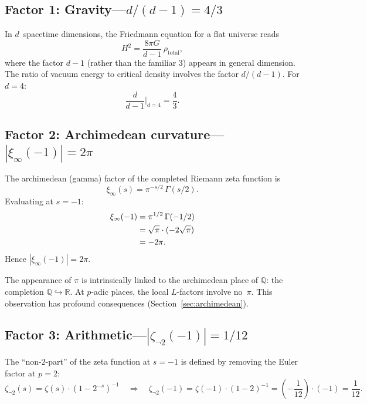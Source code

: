 \documentclass[12pt,a4paper]{article}
\theoremstyle{definition}
\newcommand{\Q}{\mathbb{Q}}
\newcommand{\R}{\mathbb{R}}
\begin{document}
\subsection{Factor 1: Gravity---$d/(d-1) = 4/3$}

In $d$~spacetime dimensions, the Friedmann equation for a flat
universe reads
\[
  H^2 = \frac{8\pi G}{d-1}\,\rho_{\text{total}},
\]
where the factor $d-1$ (rather than the familiar $3$) appears
in general dimension.
The ratio of vacuum energy to critical density involves
the factor $d/(d-1)$.
For $d=4$:
\begin{equation}
  \frac{d}{d-1}\bigg|_{d=4} = \frac{4}{3}.
\end{equation}

\subsection{Factor 2: Archimedean curvature---$|\xi_\infty(-1)| = 2\pi$}

The archimedean (gamma) factor of the completed Riemann zeta function is
\begin{equation}
  \xi_\infty(s) = \pi^{-s/2}\,\Gamma(s/2).
\end{equation}
Evaluating at $s=-1$:
\begin{align}
  \xi_\infty(-1)
    &= \pi^{1/2}\,\Gamma(-1/2) \notag\\
    &= \sqrt{\pi}\cdot(-2\sqrt{\pi}) \notag\\
    &= -2\pi.
\end{align}
Hence $|\xi_\infty(-1)| = 2\pi$.

The appearance of $\pi$ is intrinsically linked to the archimedean
place of $\Q$: the completion $\Q\hookrightarrow\R$.
At $p$-adic places, the local $L$-factors involve no~$\pi$.
This observation has profound consequences
(Section~\ref{sec:archimedean}).

\subsection{Factor 3: Arithmetic---$|\zeta_{\neg 2}(-1)| = 1/12$}

The ``non-$2$-part'' of the zeta function at $s=-1$ is defined by
removing the Euler factor at $p=2$:
\begin{equation}
  \zeta_{\neg 2}(s) = \zeta(s)\cdot(1-2^{-s})^{-1}
  \quad\Longrightarrow\quad
  \zeta_{\neg 2}(-1)
    = \zeta(-1)\cdot(1-2)^{-1}
    = \left(-\frac{1}{12}\right)\cdot(-1)
    = \frac{1}{12}.
\end{equation}
\end{document}
